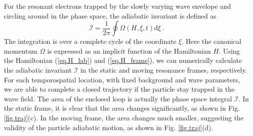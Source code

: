 For the resonant electrons trapped by the slowly varying wave envelope and circling around in the phase space,  the adiabatic invariant is defined as
\begin{equation}\label{eq.def_I}
    \mathcal{I} = \frac{1}{2\pi} \oint \Omega(H,\xi,t) \mathrm{d} \xi~.
\end{equation}
The integration is over a complete cycle of the coordinate $\xi$.
Here the canonical momentum $\Omega$ is expressed as an implicit function of the Hamiltonian $H$.
Using the Hamiltonian (\ref{eq.H_lab}) and (\ref{eq.H_frame}), 
we can numerically calculate the adiabatic invariant $\mathcal{I}$  in the static and moving resonance frames, respectively.
For each temporospatial location, with fixed background and wave parameters, we are able to complete a closed trajectory if the particle stay trapped in the wave field.  
The area of the enclosed loop is actually the phase space integral $\mathcal{I}$.
In the static frame, it is clear that the area changes significantly,
as shown in Fig. \ref{fig.traj}(c). In the moving frame, the area changes much smaller, suggesting the validity of the particle adiabatic motion, as shown in Fig. \ref{fig.traj}(d). 



